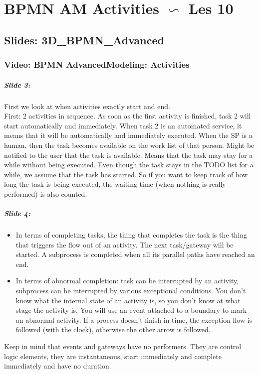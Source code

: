 \documentclass[10pt,a4paper]{report}
\begin{document}
\chapter{BPMN AM Activities $\backsim$ Les 10}
\section{Slides: 3D\_BPMN\_Advanced}
\subsection{Video: BPMN AdvancedModeling: Activities}

\paragraph{Slide 3:}First we look at when activities exactly start and end.\\
First: 2 activities in sequence. As soon as the first activity is finished, task 2 will start automatically and immediately. When task 2 is an automated service, it means that it will be automatically and immediately executed. When the SP is a human, then the task becomes available on the work list of that person. Might be notified to the user that the task is available. Means that the task may stay for a while without being executed. Even though the task stays in the TODO list for a while, we assume that the task has started. So if you want to keep track of how long the task is being executed, the waiting time (when nothing is really performed) is also counted.

\paragraph{Slide 4:}
\begin{itemize}
\item In terms of completing tasks, the thing that completes the task is the thing that triggers the flow out of an activity. The next task/gateway will be started. A subprocess is completed when all its parallel paths have reached an end.
\item In terms of abnormal completion: task can be interrupted by an activity, subprocess can be interrupted by various exceptional conditions.  You don't know what the internal state of an activity is, so you don't know at what stage the activity is. You will use an event attached to a boundary to mark an abnormal activity. If a process doesn't finish in time, the exception flow is followed (with the clock), otherwise the other arrow is followed.
\end{itemize}
Keep in mind that events and gateways have no performers. They are control logic elements, they are instantaneous, start immediately and complete immediately and have no duration.
\end{document}
